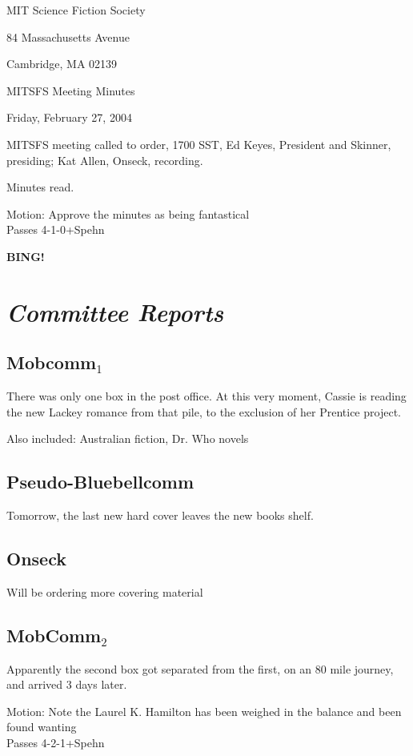 \documentclass[10pt]{article}
\newcommand{\bing}{{\bf BING!} }
\newcommand{\goto}[1]{\bing \vskip 12pt \section*{{\em{#1}}}}
\begin{document}
\begin{center}

MIT Science Fiction Society 

84 Massachusetts Avenue

Cambridge, MA 02139

\vspace{12pt}

MITSFS Meeting Minutes 

Friday, February 27, 2004

\end{center}
 
\vspace{18pt}

\setlength{\parskip}{6pt}

\noindent
MITSFS meeting called to order, 1700 SST, Ed Keyes, President and
Skinner, presiding; Kat Allen,  Onseck, recording.

Minutes read.

Motion: Approve the minutes as being fantastical\\
Passes 4-1-0+Spehn


\goto{Committee Reports}
\subsection*{Mobcomm$_1$}
There was only one box in the post office.  At this very moment,
Cassie is reading the new Lackey romance from that pile, to the
exclusion of her Prentice project.

Also included: Australian fiction, Dr. Who novels
\subsection*{Pseudo-Bluebellcomm}
Tomorrow, the last new hard cover leaves the new books shelf.
\subsection*{Onseck}
Will be ordering more covering material 

\subsection*{MobComm$_2$}
Apparently the second box got separated from the first, on an 80 mile
journey, and arrived 3 days later.

Motion: Note the Laurel K. Hamilton has been weighed in the balance and
been found wanting\\
Passes 4-2-1+Spehn
\end{document}

